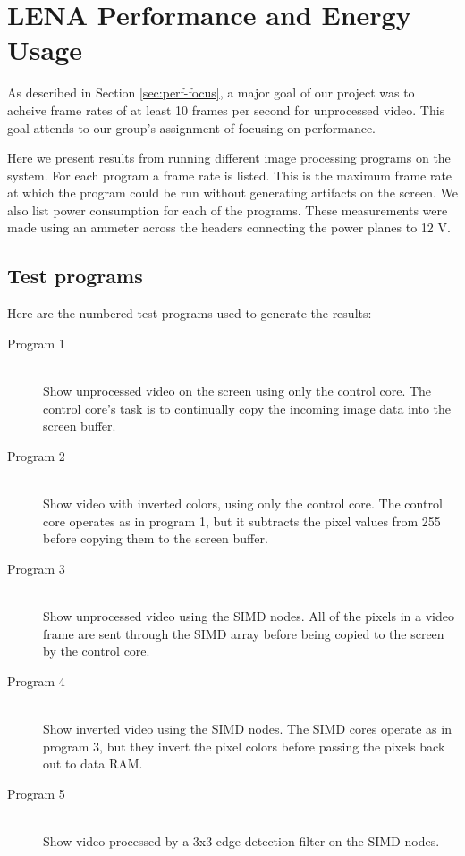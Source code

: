 \section{LENA Performance and Energy Usage}

As described in Section \ref{sec:perf-focus}, a major goal of our
project was to acheive frame rates of at least 10 frames per second for
unprocessed video. This goal attends to our group's assignment of
focusing on performance.

Here we present results from running different image processing programs
on the system. For each program a frame rate is listed. This is the
maximum frame rate at which the program could be run without generating
artifacts on the screen. We also list power consumption for
each of the programs. These measurements were made using an ammeter
across the headers connecting the power planes to 12 V.

\subsection{Test programs}

Here are the numbered test programs used to generate the results:

\begin{description}
    \item[Program 1] \hfill \\
        Show unprocessed video on the screen using only the control
        core. The control core's task is to continually copy the
        incoming image data into the screen buffer.
    \item[Program 2] \hfill \\
        Show video with inverted colors, using only the control core.
        The control core operates as in program 1, but it subtracts the
        pixel values from 255 before copying them to the screen buffer.
    \item[Program 3] \hfill \\
        Show unprocessed video using the SIMD nodes. All of the pixels
        in a video frame are sent through the SIMD array before being
        copied to the screen by the control core.
    \item[Program 4] \hfill \\
        Show inverted video using the SIMD nodes. The SIMD cores operate
        as in program 3, but they invert the pixel colors before passing
        the pixels back out to data RAM.
    \item[Program 5] \hfill \\
        Show video processed by a 3x3 edge detection filter on the SIMD
        nodes.
\end{description}

